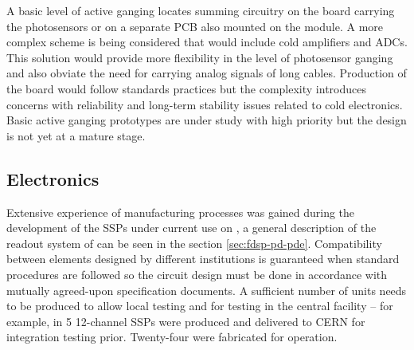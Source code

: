 A basic level of active ganging locates summing circuitry on the board carrying the photosensors or on a separate PCB also mounted on the  module.
A more complex scheme is being considered that would include cold amplifiers and ADCs. This solution would provide more flexibility in the level of photosensor ganging and also obviate the need for carrying analog signals of long cables. Production of the board would follow standards practices but the complexity introduces concerns with reliability and long-term stability issues related to cold electronics.  Basic active ganging prototypes are under study with high priority but the design is not yet at a mature stage. 




\subsection{Electronics}
\label{sec:fdsp-pd-assy-pde}

Extensive experience of manufacturing processes was gained during the development of the SSPs under current use on , a general description of the readout system of  can be seen in the section \ref{sec:fdsp-pd-pde}. Compatibility between elements designed by different institutions is guaranteed when standard procedures are followed so the circuit design must be done in accordance with mutually agreed-upon specification documents.  A sufficient  number of units needs to be produced to allow local testing and for testing in the central facility -- for example, in  \num{5} 12-channel  SSPs were produced and delivered to CERN for integration testing prior. Twenty-four were fabricated for  operation. 

